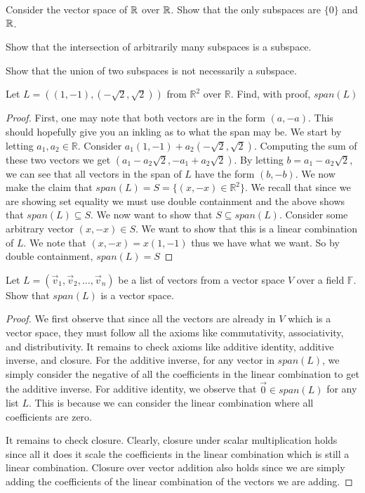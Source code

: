 \begin{exercise}
    Consider the vector space of $\mathbb{R}$ over $\mathbb{R}$. Show that the only subspaces are $\{0\}$ and $\mathbb{R}$.
\end{exercise}

\begin{exercise}
    Show that the intersection of arbitrarily many subspaces is a subspace.
\end{exercise}

\begin{exercise}
    Show that the union of two subspaces is not necessarily a subspace.
\end{exercise}

\begin{exercise}
    Let $L=((1,-1),(-\sqrt{2},\sqrt{2}))$ from $\mathbb{R}^2$ over $\mathbb{R}$. Find, with proof, $span(L)$
\end{exercise}
\begin{proof}
    First, one may note that both vectors are in the form $(a,-a)$. This should hopefully give you an inkling as to what the span may be. We start by letting $a_1,a_2\in\mathbb{R}$. Consider $a_1(1,-1)+a_2(-\sqrt{2},\sqrt{2})$. Computing the sum of these two vectors we get $(a_1-a_2\sqrt{2},-a_1+a_2\sqrt{2})$. By letting $b=a_1-a_2\sqrt{2}$, we can see that all vectors in the span of $L$ have the form $(b,-b)$. We now make the claim that $span(L)=S=\{(x,-x)\in\mathbb{R}^2\}$. We recall that since we are showing set equality we must use double containment and the above shows that $span(L)\subseteq S$. We now want to show that $S\subseteq span(L)$. Consider some arbitrary vector $(x,-x)\in S$. We want to show that this is a linear combination of $L$. We note that $(x,-x)=x(1,-1)$ thus we have what we want. So by double containment, $span(L)=S$
\end{proof}
\begin{exercise}
    Let $L=(\vec{v}_1,\vec{v}_2,\ldots,\vec{v}_n)$ be a list of vectors from a vector space $V$ over a field $\mathbb{F}$. Show that $span(L)$ is a vector space.
\end{exercise}
\begin{proof}
    We first observe that since all the vectors are already in $V$ which is a vector space, they must follow all the axioms like commutativity, associativity, and distributivity. It remains to check axioms like additive identity, additive inverse, and closure. For the additive inverse, for any vector in $span(L)$, we simply consider the negative of all the coefficients in the linear combination to get the additive inverse. For additive identity, we observe that $\vec{0}\in span(L)$ for any list $L$. This is because we can consider the linear combination where all coefficients are zero.

    It remains to check closure. Clearly, closure under scalar multiplication holds since all it does it scale the coefficients in the linear combination which is still a linear combination. Closure over vector addition also holds since we are simply adding the coefficients of the linear combination of the vectors we are adding.
\end{proof}
